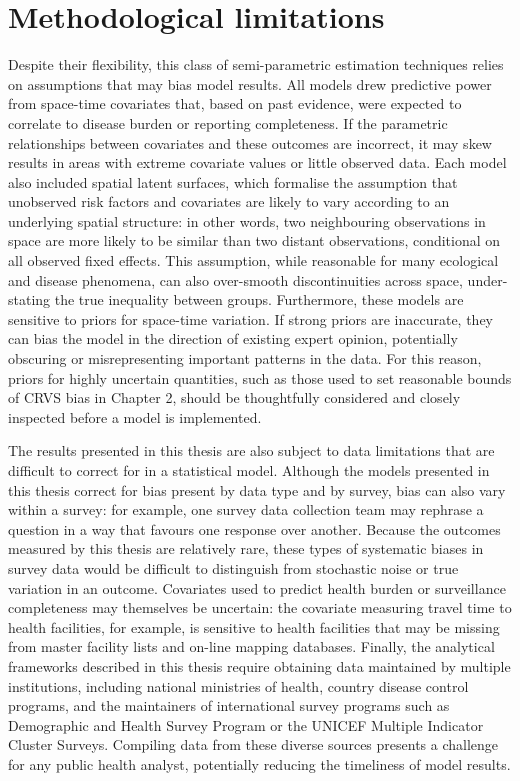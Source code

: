 \documentclass[
]{report}
\begin{document}
\hypertarget{methodological-limitations}{%
\section{Methodological limitations}\label{methodological-limitations}}

Despite their flexibility, this class of semi-parametric estimation techniques relies on assumptions that may bias model results. All models drew predictive power from space-time covariates that, based on past evidence, were expected to correlate to disease burden or reporting completeness. If the parametric relationships between covariates and these outcomes are incorrect, it may skew results in areas with extreme covariate values or little observed data. Each model also included spatial latent surfaces, which formalise the assumption that unobserved risk factors and covariates are likely to vary according to an underlying spatial structure: in other words, two neighbouring observations in space are more likely to be similar than two distant observations, conditional on all observed fixed effects. This assumption, while reasonable for many ecological and disease phenomena,\autocite{Diggle2016} can also over-smooth discontinuities across space, under-stating the true inequality between groups. Furthermore, these models are sensitive to priors for space-time variation.\autocite{Wakefield2019} If strong priors are inaccurate, they can bias the model in the direction of existing expert opinion, potentially obscuring or misrepresenting important patterns in the data. For this reason, priors for highly uncertain quantities, such as those used to set reasonable bounds of CRVS bias in Chapter 2, should be thoughtfully considered and closely inspected before a model is implemented.

The results presented in this thesis are also subject to data limitations that are difficult to correct for in a statistical model. Although the models presented in this thesis correct for bias present by data type and by survey, bias can also vary within a survey: for example, one survey data collection team may rephrase a question in a way that favours one response over another. Because the outcomes measured by this thesis are relatively rare, these types of systematic biases in survey data would be difficult to distinguish from stochastic noise or true variation in an outcome. Covariates used to predict health burden or surveillance completeness may themselves be uncertain: the covariate measuring travel time to health facilities, for example, is sensitive to health facilities that may be missing from master facility lists and on-line mapping databases.\autocite{Weiss2020} Finally, the analytical frameworks described in this thesis require obtaining data maintained by multiple institutions, including national ministries of health, country disease control programs, and the maintainers of international survey programs such as Demographic and Health Survey Program or the UNICEF Multiple Indicator Cluster Surveys. Compiling data from these diverse sources presents a challenge for any public health analyst, potentially reducing the timeliness of model results.
\end{document}
